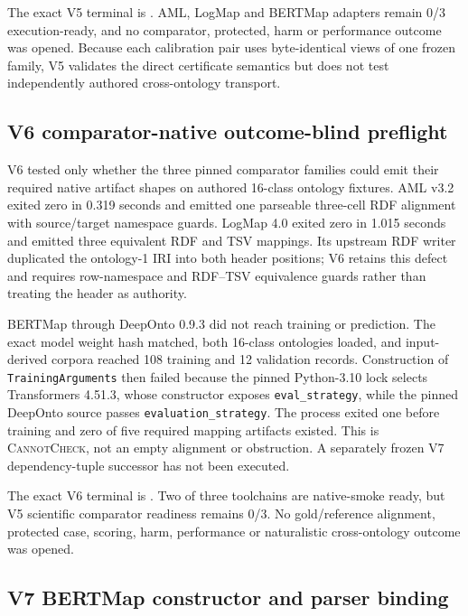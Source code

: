 The exact V5 terminal is
.
AML, LogMap and BERTMap adapters remain 0/3 execution-ready, and no comparator,
protected, harm or performance outcome was opened. Because each calibration
pair uses byte-identical views of one frozen family, V5 validates the direct
certificate semantics but does not test independently authored cross-ontology
transport.

\subsection{V6 comparator-native outcome-blind preflight}

V6 tested only whether the three pinned comparator families could emit their
required native artifact shapes on authored 16-class ontology fixtures.  AML
v3.2 exited zero in 0.319 seconds and emitted one parseable three-cell RDF
alignment with source/target namespace guards.  LogMap 4.0 exited zero in
1.015 seconds and emitted three equivalent RDF and TSV mappings.  Its upstream
RDF writer duplicated the ontology-1 IRI into both header positions; V6 retains
this defect and requires row-namespace and RDF--TSV equivalence guards rather
than treating the header as authority.

BERTMap through DeepOnto 0.9.3 did not reach training or prediction.  The exact
model weight hash matched, both 16-class ontologies loaded, and input-derived
corpora reached 108 training and 12 validation records.  Construction of
\texttt{TrainingArguments} then failed because the pinned Python-3.10 lock
selects Transformers 4.51.3, whose constructor exposes
\texttt{eval\_strategy}, while the pinned DeepOnto source passes
\texttt{evaluation\_strategy}.  The process exited one before training and
zero of five required mapping artifacts existed.  This is
\textsc{CannotCheck}, not an empty alignment or obstruction.  A separately
frozen V7 dependency-tuple successor has not been executed.

The exact V6 terminal is
.
Two of three toolchains are native-smoke ready, but V5 scientific comparator
readiness remains 0/3.  No gold/reference alignment, protected case, scoring,
harm, performance or naturalistic cross-ontology outcome was opened.

\subsection{V7 BERTMap constructor and parser binding}

